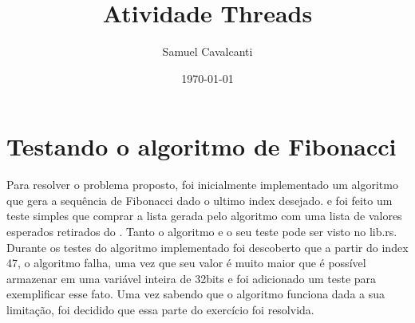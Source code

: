 \documentclass{article}
\title{Atividade Threads} %
\author{ Samuel Cavalcanti } %
\date{\today} %
\begin{document}
\maketitle %






\lstset{language=Rust,style=customRust}

\section*{Testando o algoritmo de Fibonacci}

Para resolver o problema proposto, foi inicialmente implementado um algoritmo que gera a sequência de Fibonacci dado o ultimo index desejado.
e foi feito um teste simples que comprar a lista gerada pelo algoritmo com uma lista de valores esperados retirados do \cite{wikipedia}. Tanto o algoritmo
e o seu teste pode ser visto no lib.rs. Durante os testes do algoritmo implementado foi descoberto que a partir do index 47, o algoritmo
falha, uma vez que seu valor é muito maior que é possível armazenar em uma variável inteira de 32bits e foi adicionado um teste para exemplificar
esse fato. Uma vez sabendo que o algoritmo funciona dada a sua limitação, foi decidido que essa parte do exercício foi resolvida.  



\newpage
\end{document}
